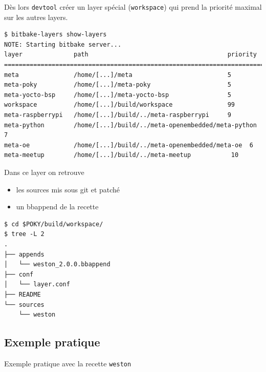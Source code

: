 \documentclass[compress]{smilebeamer}
\begin{document}
\begin{frame}[fragile]
Dès lors \texttt{devtool} créer un layer spécial (\texttt{workspace}) qui prend la priorité maximal sur les autres layers.
\begin{lstlisting}[style=shell,breaklines=false,xleftmargin=-18px,xrightmargin=-18px]
$ bitbake-layers show-layers
NOTE: Starting bitbake server...
layer              path                                      priority
=========================================================================
meta               /home/[...]/meta                          5
meta-poky          /home/[...]/meta-poky                     5
meta-yocto-bsp     /home/[...]/meta-yocto-bsp                5
workspace          /home/[...]/build/workspace               99
meta-raspberrypi   /home/[...]/build/../meta-raspberrypi     9
meta-python        /home/[...]/build/../meta-openembedded/meta-python  7
meta-oe            /home/[...]/build/../meta-openembedded/meta-oe  6
meta-meetup        /home/[...]/build/../meta-meetup           10
\end{lstlisting}
\end{frame}

\begin{frame}[fragile]
Dans ce layer on retrouve
\begin{itemize}
	\item les sources mis sous git et patché
	\item un bbappend de la recette
\end{itemize}
\begin{lstlisting}[style=shell]
$ cd $POKY/build/workspace/
$ tree -L 2 
.
├── appends
│   └── weston_2.0.0.bbappend
├── conf
│   └── layer.conf
├── README
└── sources
    └── weston
\end{lstlisting}
\end{frame}

\subsection{Exemple pratique}

\begin{frame}
\begin{center}
\textcolor{smileOrange}{\huge{Exemple pratique avec la recette \texttt{weston}}}
\end{center}
\end{frame}
\end{document}
